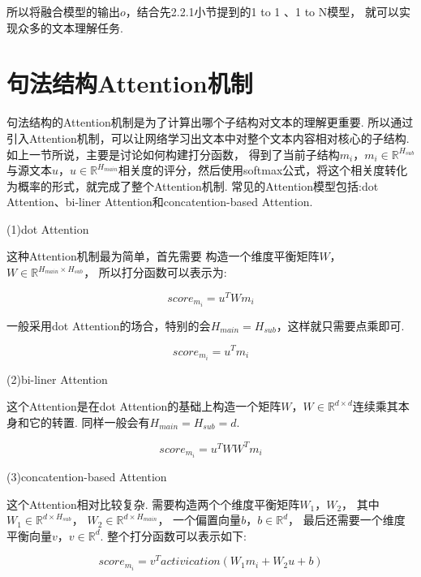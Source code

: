 \documentclass[bachelor,winfonts]{jnuthesis}
\begin{document}
所以将融合模型的输出$o$，结合先2.2.1小节提到的1 to 1 、1 to N模型，
就可以实现众多的文本理解任务. 

\section{句法结构Attention机制}
句法结构的Attention机制是为了计算出哪个子结构对文本的理解更重要.
所以通过引入Attention机制，可以让网络学习出文本中对整个文本内容相对核心的子结构.
如上一节所说，主要是讨论如何构建打分函数，
得到了当前子结构$m_{i}$，$m_{i} \in \mathbb{R}^{H_{sub}}$与源文本$u$，$u \in \mathbb{R}^{H_{main}}$相关度的评分，然后使用softmax公式，将这个相关度转化为概率的形式，就完成了整个Attention机制.
常见的Attention模型包括:dot Attention、bi-liner Attention和concatention-based Attention.

(1)dot Attention

这种Attention机制最为简单，首先需要
构造一个维度平衡矩阵$W$，$W \in \mathbb{R}^{H_{main} \times H_{sub}}$，
所以打分函数可以表示为:

\begin{equation}
  score_{m_{i}} = u^{T}Wm_{i}
\end{equation}

一般采用dot Attention的场合，特别的会$H_{main} = H_{sub}$，这样就只需要点乘即可.

\begin{equation}
  score_{m_{i}} = u^{T}m_{i}
\end{equation}

(2)bi-liner Attention

这个Attention是在dot Attention的基础上构造一个矩阵$W$，$W \in \mathbb{R}^{d \times d}$连续乘其本身和它的转置.
同样一般会有$H_{main} = H_{sub} = d $.

\begin{equation}
  score_{m_{i}} = u^{T}WW^{T}m_{i}
\end{equation}


(3)concatention-based Attention

这个Attention相对比较复杂.
需要构造两个个维度平衡矩阵$W_{1}$，$W_{2}$，
其中$W_{1} \in \mathbb{R}^{d \times H_{sub}}$，
$W_{2} \in \mathbb{R}^{d \times H_{main}}$，
一个偏置向量$b$，$b \in \mathbb{R}^{d}$，
最后还需要一个维度平衡向量$v$，$v \in \mathbb{R}^{d}$.
整个打分函数可以表示如下:

\begin{equation}
  score_{m_{i}} = v^{T}activication(W_{1}m_{i}+W_{2}u+b)
\end{equation}
\end{document}
